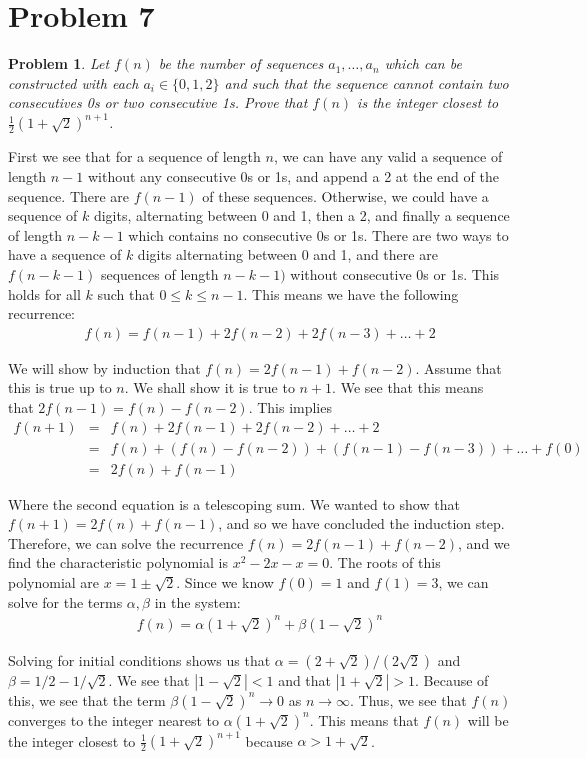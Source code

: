 \documentclass[psamsfonts]{amsart}
\newtheorem{prob}{Problem}[section]
\newenvironment{sol}{{\bfseries Solution}}{\qedsymbol}
\theoremstyle{definition}
\theoremstyle{remark}
\numberwithin{equation}{section}
\begin{document}
\section{Problem 7}

\begin{prob}
Let $f(n)$ be the number of sequences $a_1, \ldots, a_n$ which can be constructed with each $a_i \in \{0,1,2\}$ and such that the sequence cannot contain two consecutives 0s or two consecutive 1s. Prove that $f(n)$ is the integer closest to $\frac{1}{2} (1+\sqrt{2})^{n+1}$. 
\end{prob}

\begin{sol}
First we see that for a sequence of length $n$, we can have any valid a sequence of length $n-1$ without any consecutive 0s or 1s, and append a 2 at the end of the sequence. There are $f(n-1)$ of these sequences. Otherwise, we could have a sequence of $k$ digits, alternating between 0 and 1, then a 2, and finally a sequence of length $n - k - 1$ which contains no consecutive 0s or 1s. There are two ways to have a sequence of $k$ digits alternating between 0 and 1, and there are $f(n-k-1)$ sequences of length $n-k-1)$ without consecutive 0s or 1s. This holds for all $k$ such that $0 \leq k \leq n - 1$. This means we have the following recurrence:
\begin{eqnarray}
f(n) = f(n-1) + 2 f(n-2) + 2f(n-3) + \ldots + 2
\end{eqnarray}

We will show by induction that $f(n) = 2 f(n-1) + f(n-2)$. Assume that this is true up to $n$. We shall show it is true to $n+1$. We see that this means that $2f(n-1) = f(n) - f(n-2)$. This implies
\begin{eqnarray}
f(n+1) &=& f(n) + 2 f(n-1) + 2 f(n-2) + \ldots + 2 \\
&=& f(n) + (f(n) - f(n-2)) + (f(n-1) - f(n-3)) + \ldots + f(0)\\
&=& 2 f(n) + f(n-1)
\end{eqnarray}

Where the second equation is a telescoping sum. We wanted to show that $f(n+1) = 2 f(n) + f(n-1)$, and so we have concluded the induction step. Therefore, we can solve the recurrence $f(n) = 2 f(n-1) + f(n-2)$, and we find the characteristic polynomial is $x^2 - 2 x - x = 0$. The roots of this polynomial are $x = 1 \pm \sqrt{2}$. Since we know $f(0) = 1$ and $f(1) = 3$, we can solve for the terms $\alpha, \beta$ in the system:
\begin{eqnarray}
f(n) = \alpha (1 + \sqrt{2})^n + \beta ( 1 - \sqrt{2})^n
\end{eqnarray}

Solving for initial conditions shows us that $\alpha = (2 + \sqrt{2})/(2 \sqrt{2})$ and $\beta = 1/2 - 1/\sqrt{2}$. We see that $|1 - \sqrt{2}| < 1$ and that $|1 + \sqrt{2}| > 1$. Because of this, we see that the term $\beta ( 1 - \sqrt{2})^n \to 0$ as $n \to \infty$. Thus, we see that $f(n)$ converges to the integer nearest to $\alpha ( 1 + \sqrt{2})^n$. This means that $f(n)$ will be the integer closest to $\frac{1}{2}(1 + \sqrt{2})^{n+1}$ because $\alpha > 1 + \sqrt{2}$. 
\end{sol}
\end{document}
